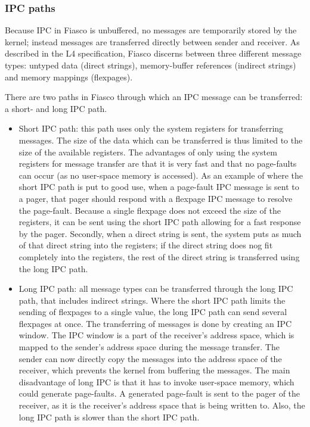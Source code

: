 \subsubsection{IPC paths}
Because IPC in Fiasco is unbuffered, no messages are temporarily stored by the kernel; instead messages are transferred directly between sender and receiver. As described in the L4 specification, Fiasco discerns between three different message types: untyped data (direct strings), memory-buffer references (indirect strings) and memory mappings (flexpages).\emptyline

There are two paths in Fiasco through which an IPC message can be transferred: a short- and long IPC path. 
\begin{itemize}
  \item Short IPC path: this path uses only the system registers for transferring messages. The size of the data which can be transferred is thus limited to the size of the available registers. The advantages of only using the system registers for message transfer are that it is very fast and that no page-faults can occur (as no user-space memory is accessed). As an example of where the short IPC path is put to good use, when a page-fault IPC message is sent to a pager, that pager should respond with a flexpage IPC message to resolve the page-fault. Because a single flexpage does not exceed the size of the registers, it can be sent using the short IPC path allowing for a fast response by the pager. Secondly, when a direct string is sent, the system puts as much of that direct string into the registers; if the direct string does nog fit completely into the registers, the rest of the direct string is transferred using the long IPC path.
  \item Long IPC path: all message types can be transferred through the long IPC path, that includes indirect strings. Where the short IPC path limits the sending of flexpages to a single value, the long IPC path can send several flexpages at once. The transferring of messages is done by creating an IPC window. The IPC window is a part of the receiver's address space, which is mapped to the sender's address space during the message transfer. The sender can now directly copy the messages into the address space of the receiver, which prevents the kernel from buffering the messages. The main disadvantage of long IPC is that it has to invoke user-space memory, which could generate page-faults. A generated page-fault is sent to the pager of the receiver, as it is the receiver's address space that is being written to. Also, the long IPC path is slower than the short IPC path.
\end{itemize}

